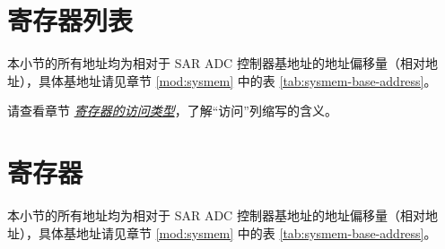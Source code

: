 \documentclass[main\_\_CN.tex]{subfiles}
\begin{document}
\section{寄存器列表}
\label{sec:adc-reg-summ}

本小节的所有地址均为相对于 SAR ADC 控制器基地址的地址偏移量（相对地址），具体基地址请见章节 \ref{mod:sysmem} \textit{} 中的表 \ref{tab:sysmem-base-address}。

请查看章节 \hyperref[glossary-access-types]{\textit{寄存器的访问类型}}，了解“访问”列缩写的含义。




\section{寄存器}
\label{sec:adc-reg}

本小节的所有地址均为相对于 SAR ADC 控制器基地址的地址偏移量（相对地址），具体基地址请见章节 \ref{mod:sysmem} \textit{} 中的表 \ref{tab:sysmem-base-address}。


\end{document}
